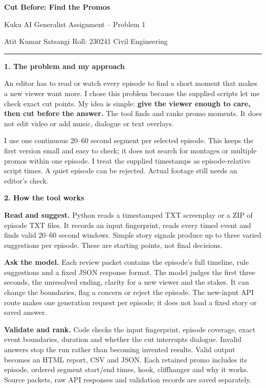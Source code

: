 \documentclass[10pt,a4paper]{article}
\newcommand{\heading}[1]{\vspace{4pt}\textbf{\large #1}\par\vspace{-2pt}}
\begin{document}
\begin{center}
{\LARGE\bfseries Cut Before: Find the Promos}\par
\vspace{4pt}
{\large Kuku AI Generalist Assignment -- Problem 1}\par
Atit Kumar Satsangi \quad Roll: 230241 \quad Civil Engineering
\end{center}
\vspace{-6pt}\hrule\vspace{5pt}

\heading{1. The problem and my approach}
An editor has to read or watch every episode to find a short moment that makes a new viewer want more. I chose this problem because the supplied scripts let me check exact cut points. My idea is simple: \textbf{give the viewer enough to care, then cut before the answer.} The tool finds and ranks promo moments. It does not edit video or add music, dialogue or text overlays.

I use one continuous 20--60 second segment per selected episode. This keeps the first version small and easy to check; it does not search for montages or multiple promos within one episode. I treat the supplied timestamps as episode-relative script times. A quiet episode can be rejected. Actual footage still needs an editor's check.

\heading{2. How the tool works}
\textbf{Read and suggest.} Python reads a timestamped TXT screenplay or a ZIP of episode TXT files. It records an input fingerprint, reads every timed event and finds valid 20--60 second windows. Simple story signals produce up to three varied suggestions per episode. These are starting points, not final decisions.

\textbf{Ask the model.} Each review packet contains the episode's full timeline, rule suggestions and a fixed JSON response format. The model judges the first three seconds, the unresolved ending, clarity for a new viewer and the stakes. It can change the boundaries, flag a concern or reject the episode. The new-input API route makes one generation request per episode; it does not load a fixed story or saved answer.

\textbf{Validate and rank.} Code checks the input fingerprint, episode coverage, exact event boundaries, duration and whether the cut interrupts dialogue. Invalid answers stop the run rather than becoming invented results. Valid output becomes an HTML report, CSV and JSON. Each retained promo includes its episode, ordered segment start/end times, hook, cliffhanger and why it works. Source packets, raw API responses and validation records are saved separately.
\end{document}
